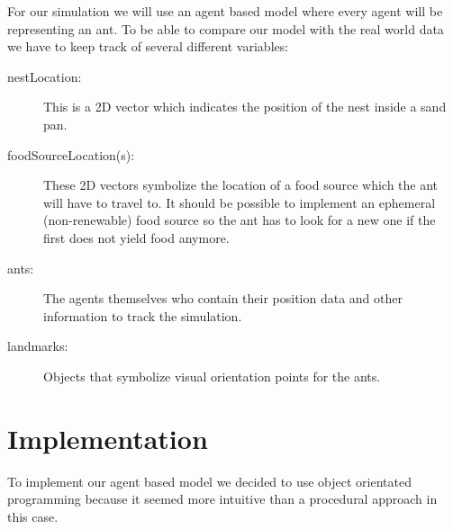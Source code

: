 \documentclass[11pt]{article}
\begin{document}
For our simulation we will use an agent based model where every agent will be representing an ant. To be able to compare our model with the real world data we have to keep track of several different variables:
\begin{description}
\item[nestLocation:] This is a 2D vector which indicates the position of the nest inside a sand pan.
\item[foodSourceLocation(s): ]These 2D vectors symbolize the location of a food source which the ant will have to travel to. It should be possible to implement an ephemeral (non-renewable) food source so the ant has to look for a new one if the first does not yield food anymore.
\item [ants: ]The agents themselves who contain their position data and other information to track the simulation.
\item[landmarks:]Objects that symbolize visual orientation points for the ants.
\end{description}












\section{Implementation}
To implement our agent based model we decided to use object orientated programming because it
seemed more intuitive than a procedural approach in this case.
\end{document}
